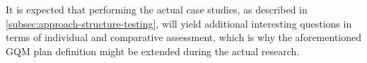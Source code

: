{		It is expected that performing the actual case studies, as described in \autoref{subsec:approach-structure-testing}, will yield additional interesting questions in terms of individual and comparative assessment, which is why the aforementioned GQM plan definition might be extended during the actual research.
	
%	
%	
%	
%	
%	
%	
%	

}
